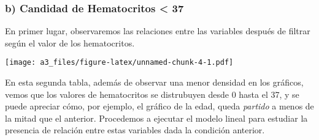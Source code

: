 \documentclass[]{article}
\newenvironment{Shaded}{\begin{snugshade}}{\end{snugshade}}
\newcommand{\DataTypeTok}[1]{\textcolor[rgb]{0.13,0.29,0.53}{#1}}
\newcommand{\DecValTok}[1]{\textcolor[rgb]{0.00,0.00,0.81}{#1}}
\newcommand{\KeywordTok}[1]{\textcolor[rgb]{0.13,0.29,0.53}{\textbf{#1}}}
\newcommand{\NormalTok}[1]{#1}
\newcommand{\OperatorTok}[1]{\textcolor[rgb]{0.81,0.36,0.00}{\textbf{#1}}}
\newcommand{\StringTok}[1]{\textcolor[rgb]{0.31,0.60,0.02}{#1}}
\begin{document}
\hypertarget{b-candidad-de-hematocritos-37}{%
\subsubsection{b) Candidad de Hematocritos \textless{}
37}\label{b-candidad-de-hematocritos-37}}

En primer lugar, observaremos las relaciones entre las variables después
de filtrar según el valor de los hematocritos.

\begin{Shaded}
\end{Shaded}

\texttt{[image: a3\_files/figure-latex/unnamed-chunk-4-1.pdf]}

En esta segunda tabla, además de observar una menor densidad en los
gráficos, vemos que los valores de hematocritos se distrubuyen desde 0
hasta el 37, y se puede apreciar cómo, por ejemplo, el gráfico de la
edad, queda \emph{partido} a menos de la mitad que el anterior.
Procedemos a ejecutar el modelo lineal para estudiar la presencia de
relación entre estas variables dada la condición anterior.

\begin{Shaded}
\end{Shaded}
\end{document}
